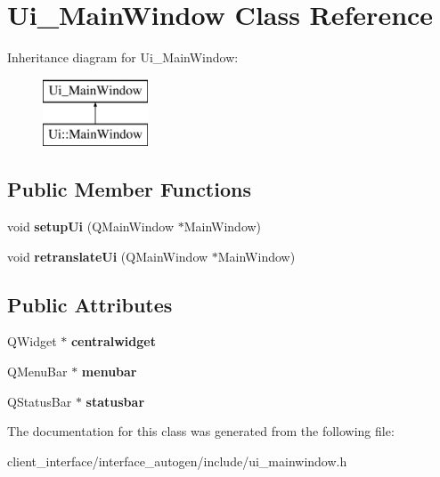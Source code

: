 \hypertarget{class_ui___main_window}{}\section{Ui\+\_\+\+Main\+Window Class Reference}
\label{class_ui___main_window}
Inheritance diagram for Ui\+\_\+\+Main\+Window\+:\begin{figure}[H]
\begin{center}
\leavevmode
\includegraphics[height=2.000000cm]{class_ui___main_window}
\end{center}
\end{figure}
\subsection*{Public Member Functions}
\begin{DoxyCompactItemize}
\item 
\mbox{\label{class_ui___main_window_acf4a0872c4c77d8f43a2ec66ed849b58}} 
void {\bfseries setup\+Ui} (Q\+Main\+Window $\ast$Main\+Window)
\item 
\mbox{\label{class_ui___main_window_a097dd160c3534a204904cb374412c618}} 
void {\bfseries retranslate\+Ui} (Q\+Main\+Window $\ast$Main\+Window)
\end{DoxyCompactItemize}
\subsection*{Public Attributes}
\begin{DoxyCompactItemize}
\item 
\mbox{\label{class_ui___main_window_a356f1cf3ebda15f1fac59467ee081b74}} 
Q\+Widget $\ast$ {\bfseries centralwidget}
\item 
\mbox{\label{class_ui___main_window_adf43d9a67adaec750aaa956b5e082f09}} 
Q\+Menu\+Bar $\ast$ {\bfseries menubar}
\item 
\mbox{\label{class_ui___main_window_a1687cceb1e2787aa1f83e50433943a91}} 
Q\+Status\+Bar $\ast$ {\bfseries statusbar}
\end{DoxyCompactItemize}


The documentation for this class was generated from the following file\+:\begin{DoxyCompactItemize}
\item 
client\+\_\+interface/interface\+\_\+autogen/include/ui\+\_\+mainwindow.\+h\end{DoxyCompactItemize}
